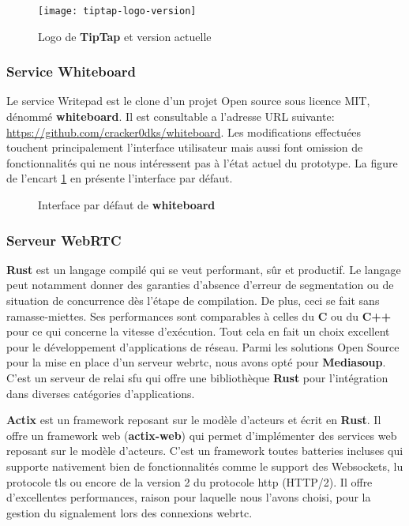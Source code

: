 \begin{figure}[H]
  \centering
  \texttt{[image: tiptap-logo-version]}
  \caption{Logo de \textbf{TipTap} et version actuelle}
  \label{fig:whiteboard_demo}
\end{figure}

\subsubsection{Service Whiteboard}
Le service Writepad est le clone d’un projet Open source sous licence MIT, dénommé \textbf{whiteboard}. 
Il est consultable a l’adresse URL suivante: \href{https://github.com/cracker0dks/whiteboard}{https://github.com/cracker0dks/whiteboard}. 
Les modifications effectuées touchent principalement l’interface utilisateur mais aussi font omission de fonctionnalités qui ne nous intéressent pas à l'état actuel du prototype. 
La figure de l’encart \ref{fig:whiteboard_demo} en présente l’interface par défaut.


\begin{figure}[H]
  \centering
  \caption{Interface par défaut de \textbf{whiteboard}}
  \label{fig:tiptap_logo_and_version}
\end{figure}


\subsubsection{Serveur WebRTC}
\textbf{Rust} est un langage compilé qui se veut performant, sûr et productif\cite{rust}. 
Le langage peut notamment donner des garanties d'absence d'erreur de segmentation ou de situation de concurrence 
dès l'étape de compilation. De plus, ceci se fait sans ramasse-miettes. Ses performances sont comparables à celles du \textbf {C} ou du \textbf{C++} pour ce qui concerne la vitesse d'exécution. 
Tout cela en fait un choix excellent pour le développement d'applications de réseau. Parmi les solutions Open Source pour la mise en place d’un serveur \acrshort{webrtc}, 
nous avons opté pour \textbf{Mediasoup}. C’est un serveur de relai \acrshort{sfu} qui offre une bibliothèque \textbf{Rust} pour l'intégration dans diverses catégories d'applications. 

\textbf{Actix} est un framework reposant sur le modèle d’acteurs \cite{actor_design_pattern} et écrit en \textbf{Rust}. 
Il offre un framework web (\textbf{actix-web}) qui permet d’implémenter des services web reposant sur le modèle d’acteurs. 
C’est un framework toutes batteries incluses qui supporte nativement bien de fonctionnalités comme le support des Websockets, lu protocole \acrshort{tls} ou encore de la version 2 du protocole \acrshort{http} (HTTP/2). 
Il offre d’excellentes performances, raison pour laquelle nous l’avons choisi, pour la gestion du signalement lors des connexions \acrshort{webrtc}.

